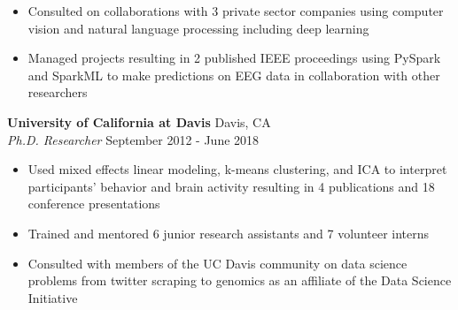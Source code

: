 \documentclass[line,margin,10pt]{res}
\begin{document}
\begin{resume}
\begin{itemize}
\item Consulted on collaborations with 3 private sector companies using computer vision and natural language processing including deep learning
\item Managed projects resulting in 2 published IEEE proceedings using PySpark and SparkML to make predictions on EEG data in collaboration with other researchers
\end{itemize}
{\vspace{-0.25cm}}
\textbf{University of California at Davis} \hfill Davis, CA \\
{\sl Ph.D. Researcher} \hfill September 2012 - June 2018
\begin{itemize} \itemsep -2pt
\item Used mixed effects linear modeling, k-means clustering, and ICA to interpret participants' behavior and brain activity resulting in 4 publications and 18 conference presentations
\item Trained and mentored 6 junior research assistants and 7 volunteer interns
\item Consulted with members of the UC Davis community on data science problems from twitter scraping to genomics as an affiliate of the Data Science Initiative
\end{itemize}
{\vspace{-0.25cm}}



\end{resume}
\end{document}
